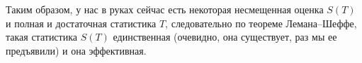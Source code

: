 \begin{solution}
    Таким образом, у нас в руках сейчас есть некоторая несмещенная оценка $S(T)$ и полная и достаточная статистика $T$, следовательно по теореме Лемана--Шеффе, такая статистика $S(T)$ единственная (очевидно, она существует, раз мы ее предъявили) и она эффективная.
\end{solution}